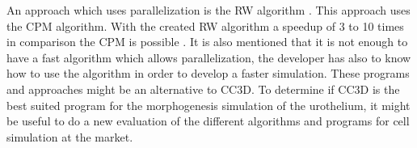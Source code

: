 An approach which uses parallelization is the \ac{RW} algorithm \cite{Cercato2006}. This approach uses the \ac{CPM} algorithm. With the created \ac{RW} algorithm a speedup of 3 to 10 times in comparison the \ac{CPM} is possible \cite{Cercato2006}. It is also mentioned that it is not enough to have a fast algorithm which allows parallelization, the developer has also to know how to use the algorithm in order to develop a faster simulation. \newline
These programs and approaches might be an alternative to \ac{CC3D}. To determine if \ac{CC3D} is the best suited program for the morphogenesis simulation of the urothelium, it might be useful to do a new evaluation of the different algorithms and programs for cell simulation at the market.



